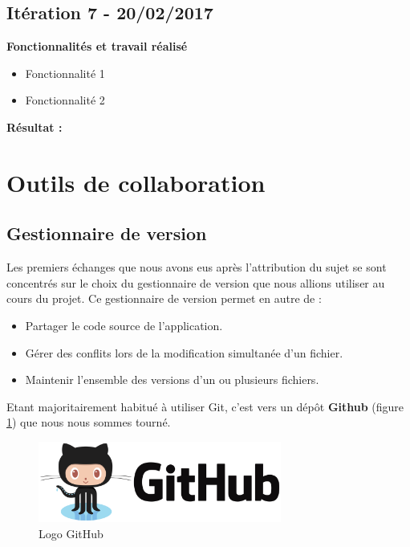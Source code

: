 \subsection{Itération 7 - 20/02/2017}
\textbf{Fonctionnalités et travail réalisé}
\begin{itemize}
\item Fonctionnalité 1
\item Fonctionnalité 2 \\
\end{itemize}

\textbf{Résultat :}\\


\section{Outils de collaboration}

\subsection{Gestionnaire de version}
Les premiers échanges que nous avons eus après l'attribution du sujet se sont concentrés sur le choix du gestionnaire de version que nous allions utiliser au cours du projet. Ce gestionnaire de version permet en autre de :
\begin{itemize}
\item Partager le code source de l'application.
\item Gérer des conflits lors de la modification simultanée d'un fichier.
\item Maintenir l'ensemble des versions d'un ou plusieurs fichiers.\\
\end{itemize}

Etant majoritairement habitué à utiliser Git, c'est vers un dép\^ot \textbf{Github} (figure \ref{github_logo}) que nous nous sommes tourné.

\begin{figure}[H]
\centering
\includegraphics[width=8cm]{images/activite/githubLogo.png}
\caption{Logo GitHub}
\label{github_logo}
\end{figure}



